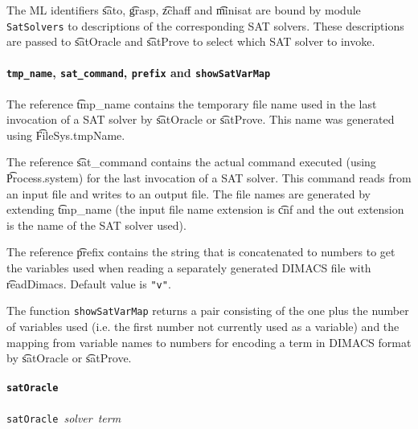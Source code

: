 The ML identifiers \t{sato}, \t{grasp}, \t{zchaff} and \t{minisat} are bound
by module {\tt SatSolvers} to descriptions of the corresponding SAT solvers.
These descriptions are passed to \t{satOracle} and \t{satProve} to
select which SAT solver to invoke.

\paragraph{{\tt tmp\_name}, {\tt sat\_command}, {\tt prefix} and {\tt showSatVarMap}}${}$\\

The reference \t{tmp\_name} contains the temporary file name used in
the last invocation of a SAT solver  by \t{satOracle} or \t{satProve}. This name
was generated using \t{FileSys.tmpName}.

The reference \t{sat\_command} contains the actual command executed
(using \t{Process.system}) for
the last invocation of a SAT solver. This command reads from
an input file and writes to an output file. The file names are generated by extending \t{tmp\_name}
(the input file name extension is \t{cnf} and the out extension is the name of the SAT solver used).

The reference \t{prefix} contains the string that is concatenated to numbers
to get the \HOL{} variables used when reading a separately generated DIMACS file
with \t{readDimacs}. Default value is {\verb+"v"+}.

The function {\small\verb+showSatVarMap+} returns a pair consisting of
the one plus the number of variables used (i.e. the first number not
currently used as a variable) and the mapping from variable names to
numbers for encoding a term in DIMACS format by
\t{satOracle} or \t{satProve}.

\paragraph{\tt satOracle}${}$\\
{\small{\tt satOracle}~{\it solver}~{\it term}}


